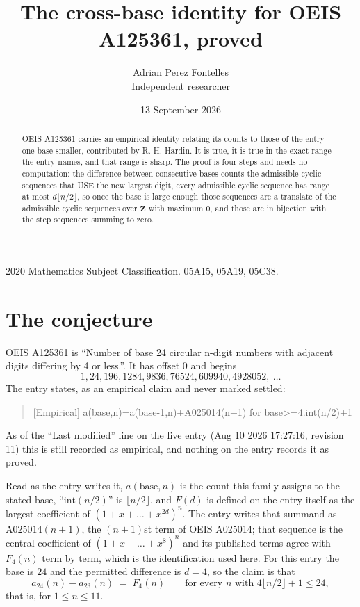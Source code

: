 \documentclass[11pt,a4paper]{article}
\title{The cross-base identity for OEIS A125361, proved}
\author{Adrian Perez Fontelles\\ \small Independent researcher}
\date{13 September 2026}
\theoremstyle{plain}
\theoremstyle{definition}
\begin{document}
\maketitle

\begin{abstract}
OEIS A125361 carries an empirical identity relating its counts to those of the entry one base
smaller, contributed by R. H. Hardin. It is true, it is true in the exact range the entry
names, and that range is sharp. The proof is four steps and needs no computation: the
difference between consecutive bases counts the admissible cyclic sequences that USE the new
largest digit, every admissible cyclic sequence has range at most $d\lfloor n/2\rfloor$, so
once the base is large enough those sequences are a translate of the admissible cyclic
sequences over $\mathbf{Z}$ with maximum $0$, and those are in bijection with the step
sequences summing to zero.
\end{abstract}

\noindent\small 2020 Mathematics Subject Classification. 05A15, 05A19, 05C38.\normalsize

\section{The conjecture}

OEIS A125361 is ``Number of base 24 circular n-digit numbers with adjacent digits differing by 4 or less.''. It has offset $0$ and begins
\[
1, 24, 196, 1284, 9836, 76524, 609940, 4928052,\ \dots
\]
The entry states, as an empirical claim and never marked settled:
\begin{quote}
[Empirical] a(base,n)=a(base-1,n)+A025014(n+1) for base>=4.int(n/2)+1
\end{quote}
As of the ``Last modified'' line on the live entry (Aug 10 2026 17:27:16, revision 11)
this is still recorded as empirical, and nothing on the entry records it as proved.

Read as the entry writes it, $a(\mathrm{base},n)$ is the count this family assigns to the
stated base, ``$\mathrm{int}(n/2)$'' is $\lfloor n/2\rfloor$, and $F(d)$ is defined on the
entry itself as the largest coefficient of $(1+x+\dots+x^{2d})^{n}$. The entry writes that summand as $\mathrm{A025014}(n+1)$, the $(n+1)$st term of OEIS A025014; that sequence is the central coefficient of $(1+x+\dots+x^{8})^{n}$ and its published terms agree with $F_{4}(n)$ term by term, which is the identification used here. For this entry
the base is $24$ and the permitted difference is $d=4$, so the claim is that
\[
a_{24}(n)-a_{23}(n)\;=\;F_{4}(n)
\qquad\text{for every } n \text{ with } 4\lfloor n/2\rfloor+1\le24,
\]
that is, for $1\le n\le11$.
\end{document}
